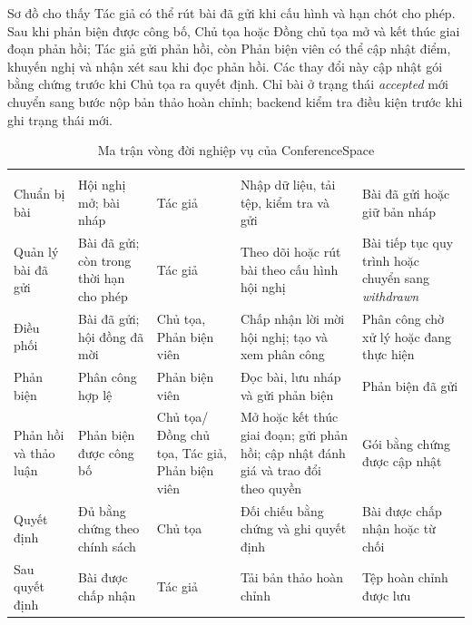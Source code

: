 Sơ đồ cho thấy Tác giả có thể rút bài đã gửi khi cấu hình và hạn chót cho phép. Sau khi phản biện được công bố, Chủ tọa hoặc Đồng chủ tọa mở và kết thúc giai đoạn phản hồi; Tác giả gửi phản hồi, còn Phản biện viên có thể cập nhật điểm, khuyến nghị và nhận xét sau khi đọc phản hồi. Các thay đổi này cập nhật gói bằng chứng trước khi Chủ tọa ra quyết định. Chỉ bài ở trạng thái \textit{accepted} mới chuyển sang bước nộp bản thảo hoàn chỉnh; backend kiểm tra điều kiện trước khi ghi trạng thái mới.

\begingroup
\setlength{\tabcolsep}{2pt}
\begin{longtable}{|P{0.18\textwidth}|P{0.20\textwidth}|P{0.17\textwidth}|P{0.20\textwidth}|P{0.17\textwidth}|}
  \caption{Ma trận vòng đời nghiệp vụ của ConferenceSpace}\label{tab:ch3-lifecycle-cut}\\
  \hline
   &  &  &  &  \\ \hline
  \endfirsthead
  \hline
   &  &  &  &  \\ \hline
  \endhead
  Chuẩn bị bài & Hội nghị mở; bài nháp & Tác giả & Nhập dữ liệu, tải tệp, kiểm tra và gửi & Bài đã gửi hoặc giữ bản nháp \\ \hline
  Quản lý bài đã gửi & Bài đã gửi; còn trong thời hạn cho phép & Tác giả & Theo dõi hoặc rút bài theo cấu hình hội nghị & Bài tiếp tục quy trình hoặc chuyển sang \textit{withdrawn} \\ \hline
  Điều phối & Bài đã gửi; hội đồng đã mời & Chủ tọa, Phản biện viên & Chấp nhận lời mời hội nghị; tạo và xem phân công & Phân công chờ xử lý hoặc đang thực hiện \\ \hline
  Phản biện & Phân công hợp lệ & Phản biện viên & Đọc bài, lưu nháp và gửi phản biện & Phản biện đã gửi \\ \hline
  Phản hồi và thảo luận & Phản biện được công bố & Chủ tọa/Đồng chủ tọa, Tác giả, Phản biện viên & Mở hoặc kết thúc giai đoạn; gửi phản hồi; cập nhật đánh giá và trao đổi theo quyền & Gói bằng chứng được cập nhật \\ \hline
  Quyết định & Đủ bằng chứng theo chính sách & Chủ tọa & Đối chiếu bằng chứng và ghi quyết định & Bài được chấp nhận hoặc từ chối \\ \hline
  Sau quyết định & Bài được chấp nhận & Tác giả & Tải bản thảo hoàn chỉnh & Tệp hoàn chỉnh được lưu \\ \hline
\end{longtable}
\endgroup

